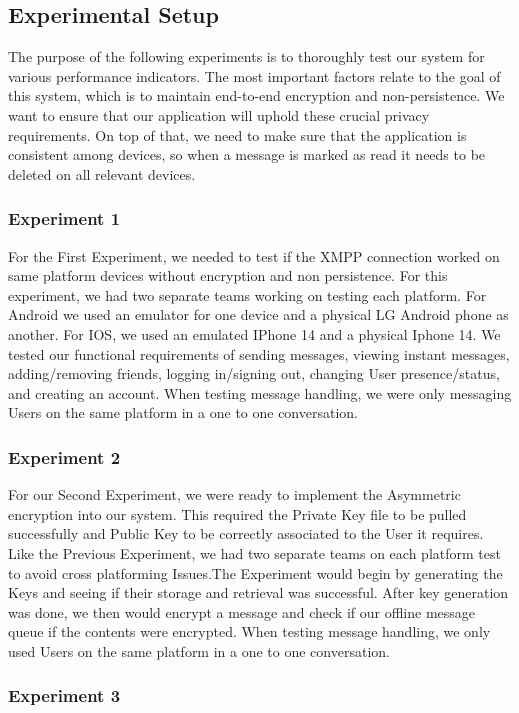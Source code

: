 \documentclass[12pt]{article}
\begin{document}
\subsection{Experimental Setup}\label{sec:exp_setup}
The purpose of the following experiments is to thoroughly test our system for various performance indicators. The most important factors relate to the goal of this system, which is to maintain end-to-end encryption and non-persistence. We want to ensure that our application will uphold these crucial privacy requirements. On top of that, we need to make sure that the application is consistent among devices, so when a message is marked as read it needs to be deleted on all relevant devices.

\subsubsection{Experiment 1}
For the First Experiment, we needed to test if the XMPP connection worked on same platform devices without encryption and non persistence. For this experiment, we had two separate teams working on testing each platform. For Android we used an emulator for one device and a physical LG Android phone as another. For IOS, we used an emulated IPhone 14 and a physical Iphone 14. We tested our functional requirements of sending messages, viewing instant messages, adding/removing friends, logging in/signing out, changing User presence/status, and creating an account. When testing message handling, we were only messaging Users on the same platform in a one to one conversation.

\subsubsection{Experiment 2}
For our Second Experiment, we were ready to implement the Asymmetric encryption into our system. This required the Private Key file to be pulled successfully and Public Key to be correctly associated to the User it requires. Like the Previous Experiment, we had two separate teams on each platform test to avoid cross platforming Issues.The Experiment would begin by generating the Keys and seeing if their storage and retrieval was successful. After key generation was done, we then would encrypt a message and check if our offline message queue if the contents were encrypted. When testing message handling, we only used Users on the same platform in a one to one conversation. 

\subsubsection{Experiment 3}
\end{document}
